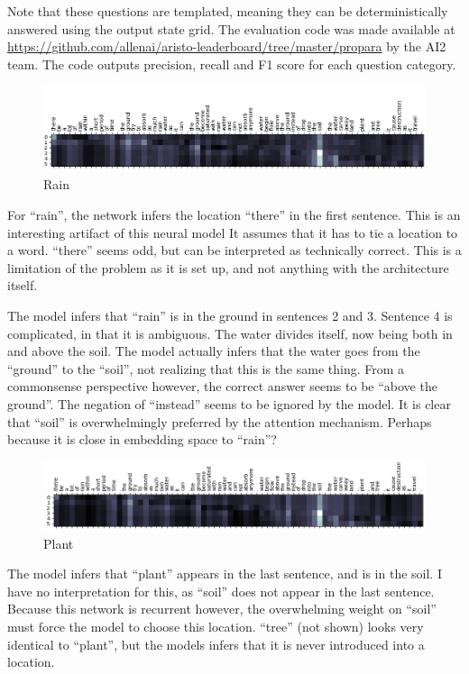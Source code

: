 \documentclass[11pt,a4paper]{article}
\begin{document}
Note that these questions are templated, meaning they can be deterministically 
answered using the output state grid. The evaluation code was made available 
at \url{https://github.com/allenai/aristo-leaderboard/tree/master/propara} by 
the AI2 team. The code outputs precision, recall and F1 score for each 
question category.

\begin{figure}[h]
  \includegraphics[width=\linewidth]{images/rain.png}
  \caption{Rain}
  \label{fig:boat1}
\end{figure}

For “rain”, the network infers the location “there” in the first sentence. This is an interesting artifact of this neural model It assumes that it has to tie a location to a word. “there” seems odd, but can be interpreted as technically correct. This is a limitation of the problem as it is set up, and not anything with the architecture itself.

The model infers that “rain” is in the ground in sentences 2 and 3. Sentence 4 is complicated, in that it is ambiguous. The water divides itself, now being both in and above the soil. The model actually infers that the water goes from the “ground” to the “soil”, not realizing that this is the same thing. From a commonsense perspective however, the correct answer seems to be “above the ground”. The negation of “instead” seems to be ignored by the model. It is clear that “soil” is overwhelmingly preferred by the attention mechanism. Perhaps because it is close in embedding space to “rain”? 

\begin{figure}[h]
  \includegraphics[width=\linewidth]{images/plant.png}
  \caption{Plant}
  \label{fig:boat1}
\end{figure}

The model infers that “plant” appears in the last sentence, and is in the soil. I have no interpretation for this, as “soil” does not appear in the last sentence. Because this network is recurrent however, the overwhelming weight on “soil” must force the model to choose this location. “tree” (not shown) looks very identical to “plant”, but the models infers that it is never introduced into a location.
\end{document}
